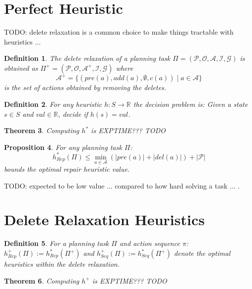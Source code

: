 \documentclass[twocolumn]{article}
\newcommand{\task}{\ensuremath{\Pi}\xspace}
\newcommand{\preds}{\ensuremath{\mathcal{P}}\xspace}
\newcommand{\acts}{\ensuremath{\mathcal{A}}\xspace}
\newcommand{\objects}{\ensuremath{\mathcal{O}}\xspace}
\newcommand{\init}{\ensuremath{\mathcal{I}}\xspace}
\newcommand{\goal}{\ensuremath{\mathcal{G}}\xspace}
\newcommand{\states}{\ensuremath{S}\xspace}
\newcommand{\someState}{\ensuremath{s}\xspace}
\newcommand{\prename}{\ensuremath{pre}\xspace}
\newcommand{\addname}{\ensuremath{add}\xspace}
\newcommand{\delname}{\ensuremath{del}\xspace}
\newcommand{\pre}[1]{\ensuremath{\prename(#1)}\xspace}
\newcommand{\add}[1]{\ensuremath{\addname(#1)}\xspace}
\newcommand{\del}[1]{\ensuremath{\delname(#1)}\xspace}
\newcommand{\arity}[1]{\ensuremath{|#1|}}
\newcommand{\cost}[1]{\ensuremath{c(#1)}\xspace}
\newcommand{\someAct}{\ensuremath{a}\xspace}
\newcommand{\someActSeq}{\ensuremath{\pi}\xspace}
\newcommand{\optimalHeuristic}{\ensuremath{h^{*}_{Rep}}\xspace}
\newcommand{\optimalHeuristicSeq}{\ensuremath{h^{*}_{Seq}}\xspace}
\newcommand{\optimalHeuristicRel}{\ensuremath{h^{+}_{Rep}}\xspace}
\newcommand{\optimalHeuristicSeqRel}{\ensuremath{h^{+}_{Seq}}\xspace}
\newcommand{\relaxedActs}{\ensuremath{\acts^{+}}\xspace}
\newcommand{\relaxedTask}{\ensuremath{\task^{+}}\xspace}
\newtheorem{theorem}{Theorem}
\newtheorem{proposition}[theorem]{Proposition}
\newtheorem{definition}[theorem]{Definition}
\begin{document}
	\section{Perfect Heuristic}
	
	TODO: delete relaxation is a common choice to make things tractable with heuristics ...
	
	\begin{definition}
		The delete relaxation of a planning task
		$\task = (\preds, \objects, \acts, \init, \goal)$
		is obtained as
		$\relaxedTask = (\preds, \objects, \relaxedActs, \init, \goal)$
		where 
		$$
		\relaxedActs = \{
		(\pre{\someAct}, \add{\someAct}, \emptyset, \cost{\someAct}) \mid \someAct \in \acts
		\}
		$$
		is the set of actions obtained by removing the deletes.
	\end{definition}
	
	\begin{definition}
		For any heuristic $h: \states \rightarrow \mathbb{R}$ the decision problem is:
		Given a state $\someState \in \states$ and $\mathit{val} \in \mathbb{R}$, decide if $h(\someState) = \mathit{val}$.
	\end{definition}
	
	\begin{theorem}
		Computing $h^*$ is EXPTIME??? TODO
	\end{theorem}
	
	
	\begin{proposition}
		For any planning task \task:
		$$\optimalHeuristic(\task) \leq \min_{\someAct \in \acts}(\arity{\pre{\someAct}} + \arity{\del{\someAct}}) + \arity{\preds}$$
		bounds the optimal repair heuristic value.
	\end{proposition}
	
	TODO: expected to be low value ... compared to how hard solving a task ... .
	
	\section{Delete Relaxation Heuristics}
	
	\begin{definition}
		For a planning task \task and action sequence \someActSeq:
		$\optimalHeuristicRel(\task) := \optimalHeuristic(\relaxedTask)$
		and 
		$\optimalHeuristicSeqRel(\task) := \optimalHeuristicSeq(\relaxedTask)$
		denote the optimal heuristics within the delete relaxation.
	\end{definition}
	
	\begin{theorem}
		Computing $h^+$ is EXPTIME??? TODO
	\end{theorem}
	
\end{document}
